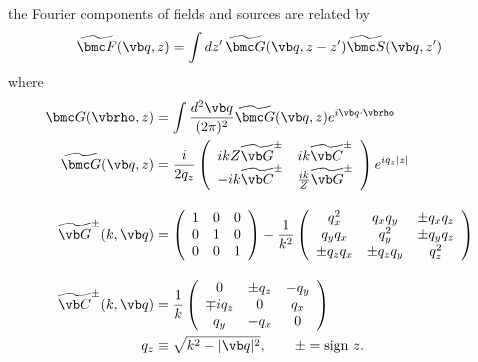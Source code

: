 \documentclass[letterpaper]{article}
\renewcommand{\wt}{\widetilde}
\begin{document}
the Fourier components of fields and sources are related by
$$\wt{\bmc F}(\vb q,z)=\int dz^\prime \, 
  \wt{\bmc G}(\vb q,z-z^\prime)\wt{\bmc S}(\vb q,z^\prime)
$$
where
\begin{subequations}
\begin{align}
  \bmc G(\vbrho, z)
 &=
  \int \frac{d^2 \vb q}{(2\pi)^2}
  \wt{\bmc G}(\vb q, z) e^{i\vb q \cdot \vbrho}
\\
   \wt{\bmc G}(\vb q, z)
&= \frac{i}{2q_z}
   \left(\begin{array}{cc}
   ikZ  \wt{\vb G}^\pm & ik\wt{\vb C}^\pm \\
  -ik\wt{ \vb C}^\pm & \frac{ik}{Z}\wt{\vb G}^\pm
   \end{array}\right)e^{iq_z |z|}
\\[10pt]
   \wt{\vb G}^\pm(k, \vb q) 
&= \left(\begin{array}{ccc}
   1 & 0 & 0 \\ 0 & 1 & 0 \\ 0 & 0 & 1
   \end{array}\right)
   -
   \frac{1}{k^2}
   \left(\begin{array}{ccc}
    q_x^2    & q_xq_y       & \pm q_x q_z \\
    q_y q_x  & q_y^2        & \pm q_y q_z \\
 \pm q_z q_x  & \pm q_z q_y  & q_z^2 
   \end{array}\right)
\\[10pt]
   \wt{\vb C}^\pm(k, \vb q) 
&=
   \frac{1}{k} 
   \left(\begin{array}{ccc}
   0           & \pm q_z &    -q_y \\
   \mp iq_z    & 0       &     q_x \\
        q_y    & -q_x    &      0
  \end{array}\right)
\\
  q_z &\equiv \sqrt{k^2 - |\vb q|^2},
 \qquad \pm = \text{sign } z.
\end{align}
\label{GFourier}
\end{subequations}

\end{document}
